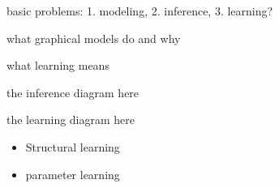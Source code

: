 











basic problems: 1. modeling, 2. inference, 3. learning?

what graphical models do and why

what learning means


the inference diagram here


the learning diagram here
\begin{itemize}
\item Structural learning
\item parameter learning
\end{itemize}


